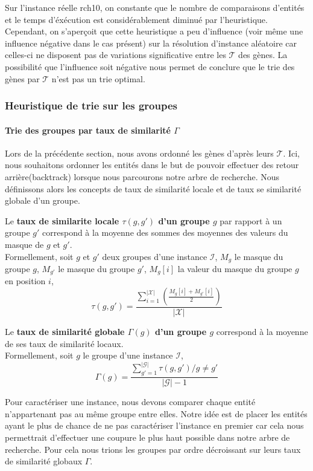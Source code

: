Sur l'instance réelle rch10, on constante que le nombre de comparaisons d'entités  et le temps d'éxécution est considérablement diminué par l'heuristique. Cependant, on s'aperçoit que cette heuristique a peu d'influence (voir même une influence négative dans le cas présent) sur la résolution d'instance aléatoire car celles-ci ne disposent pas de variations significative entre les $\mathcal{T}$ des gènes. La possibilité que l'influence soit négative nous permet de conclure que le trie des gènes par $\mathcal{T}$ n'est pas un trie optimal. 


\subsubsection{Heuristique de trie sur les groupes}
\paragraph{Trie des groupes par taux de similarité $\Gamma$}
Lors de la précédente section, nous avons ordonné les gènes d'après leurs $\mathcal{T}$. Ici, nous souhaitons ordonner les entités dans le but de pouvoir effectuer des retour arrière(backtrack) lorsque nous parcourons notre arbre de recherche. Nous définissons alors les concepts de taux de similarité locale et de taux se similarité globale d'un groupe.

\begin{definition}
Le \textbf{taux de similarite locale $\tau(g,g')$ d'un groupe $g$} par rapport à un groupe $g'$ correspond à la moyenne des sommes des moyennes des valeurs du masque de $g$ et $g'$.\\
Formellement, soit $g$ et $g'$ deux groupes d'une instance $\mathcal{I}$, $M_g$ le masque du groupe $g$, $M_{g'}$ le masque du groupe $g'$, $M_g[i]$ la valeur du masque du groupe $g$ en position $i$,
$$ \tau(g,g')= \frac{\sum_{i=1}^{|\mathcal{X}|}(\frac{M_g[i]+M_{g'}[i]}{2})}{|\mathcal{X}|}$$
\end{definition}

\begin{definition}
Le \textbf{taux de similarité globale $\Gamma(g)$ d'un groupe $g$} correspond à la moyenne de ses taux de similarité locaux.\\
Formellement, soit $g$ le groupe d'une instance $\mathcal{I}$,
$$ \Gamma(g)=\frac{\sum_{g'=1}^{|\mathcal{G}|}\tau(g,g') /g \neq g'}{|\mathcal{G}|-1} $$
\end{definition}

Pour caractériser une instance, nous devons comparer chaque entité n'appartenant pas au même groupe entre elles. Notre idée est de placer les entités ayant le plus de chance de ne pas caractériser l'instance en premier car cela nous permettrait d'effectuer une coupure le plus haut possible dans notre arbre de recherche. Pour cela nous trions les groupes par ordre décroissant sur leurs taux de similarité globaux $\Gamma$.



